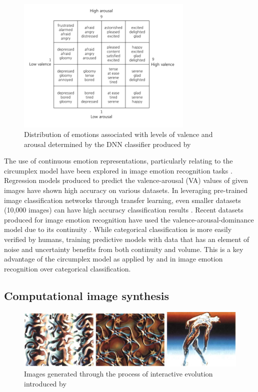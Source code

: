 \documentclass{article}
\begin{document}
\begin{figure}[h!]
	\centering
	\includegraphics[width=0.75\textwidth]{images/valence-arousal-grid.png}
	\caption{Distribution of emotions associated with levels of valence and arousal determined by the DNN classifier produced by \citet{kim2018building}}
	\label{fig:valence-arousal}
\end{figure}

The use of continuous emotion representations, particularly relating to the circumplex model have been explored in image emotion recognition tasks \citep{kim2018building, zhao2016predicting, zhao2017continuous}.
Regression models produced to predict the valence-arousal (VA) values of given images have shown high accuracy on various datasets.
In leveraging pre-trained image classification networks through transfer learning, even smaller datasets (10,000 images) can have high accuracy classification results \citep{kim2018building}.
Recent datasets produced for image emotion recognition have used the valence-arousal-dominance model due to its continuity \citep{zhao2016predicting}.
While categorical classification is more easily verified by humans, training predictive models with data that has an element of noise and uncertainty benefits from both continuity and volume.
This is a key advantage of the circumplex model as applied by \citet{kim2018building} and \citet{zhao2016predicting} in image emotion recognition over categorical classification.


\subsection{Computational image synthesis}

\begin{figure}[h!]
	\includegraphics[width=\textwidth]{images/sims-interactive-image-generation.png}
	\caption{Images generated through the process of interactive evolution introduced by \citet{sims}}
	\label{fig:sims}
\end{figure}
\end{document}
